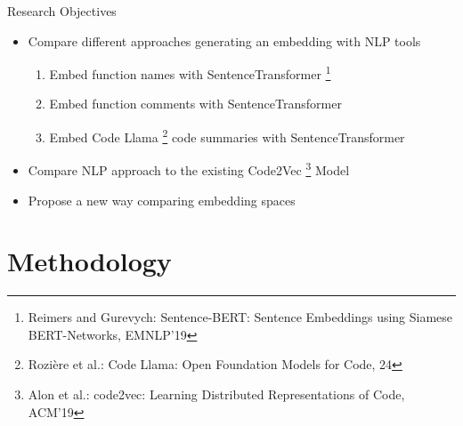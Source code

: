 \documentclass[aspectratio=1610,12pt]{beamer}
\begin{document}
\begin{frame}[t]{Research Objectives}
  \begin{itemize}
    \item Compare different approaches generating an embedding with NLP
      tools
    \begin{enumerate}
      \item Embed function names with SentenceTransformer
        \footnote{\scriptsize Reimers and Gurevych: 
            Sentence-BERT: Sentence Embeddings using Siamese BERT-Networks,
            EMNLP'19
        }
      \item Embed function comments with SentenceTransformer
      \item Embed Code Llama 
        \footnote{\scriptsize Rozière et al.: 
            Code Llama: Open Foundation Models for Code,
            24
        }
        code summaries with SentenceTransformer
    \end{enumerate}
    \item Compare NLP approach to the existing Code2Vec
        \footnote{\scriptsize Alon et al.: 
            code2vec: Learning Distributed Representations of Code,
            ACM'19
        }
      Model
    \item Propose a new way comparing embedding spaces
  \end{itemize}
\end{frame}

\section{Methodology}
\end{document}
